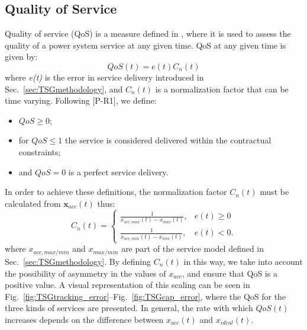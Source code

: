 \subsection{Quality of Service}
Quality of service (QoS) is a measure defined in \cite{bondy2014performance}, where it is used to assess the quality of a power system service at any given time. QoS at any given time is given by:
\begin{equation}\label{eq:QoS}
QoS(t)=e(t)C_{n}(t)
\end{equation}
where \emph{e(t)} is the error in service delivery introduced in Sec.~\ref{sec:TSGmethodology}, and $C_n(t)$ is a normalization factor that can be time varying. Following [P-R1], we define:
\begin{itemize}
\item $QoS \geq 0$;
\item for $QoS \leq 1$ the service is considered delivered within the contractual constraints;
\item and $QoS = 0$ is a perfect service delivery.
\end{itemize}
In order to achieve these definitions, the normalization factor $C_{n}(t)$ must be calculated from $\mathbf{x}_{acc}(t)$ thus:
\begin{equation}
C_{n}(t) = 
\begin{cases}
\frac{1}{x_{acc,max}(t) - x_{max}(t)}, & e(t) \geq 0 \\
\frac{1}{x_{acc,min}(t) - x_{min}(t)}, & e(t) < 0.
\end{cases}\label{eq:cst}
\end{equation}
where $x_{acc,max/min}$ and $x_{max/min}$ are part of the service model defined in Sec.~\ref{sec:TSGmethodology}. By defining $C_{n}(t)$ in this way, we take into account the possibility of asymmetry in the values of $x_{acc}$, and ensure that QoS is a positive value. A visual representation of this scaling can be seen in Fig.~\ref{fig:TSGtracking_error}--Fig.~\ref{fig:TSGcap_error}, where the QoS for the three kinds of services are presented.
In general, the rate with which $QoS(t)$ increases depends on the difference between $x_{acc}(t)$ and $x_{ideal}(t)$.
